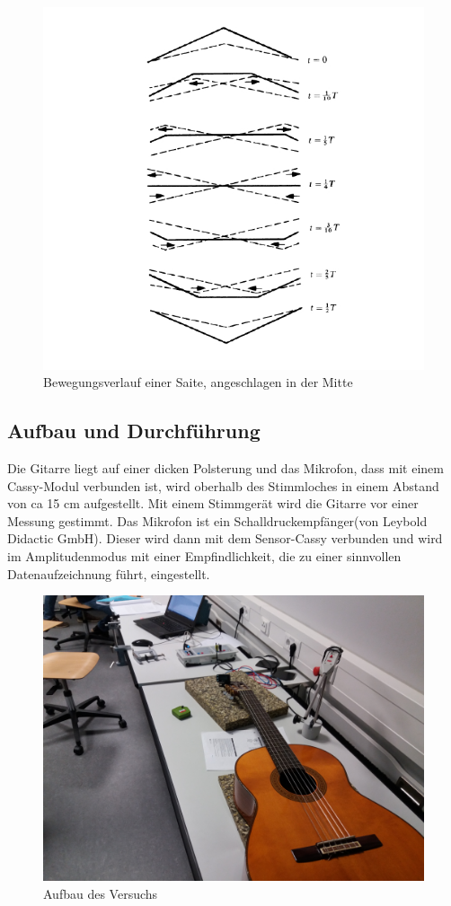 \documentclass[a4paper, 11pt]{article}
\begin{document}
\begin{figure}[H]
	\centering
	\includegraphics[scale=0.4]{../Bewegungsverlauf.jpg}
	\caption{Bewegungsverlauf einer Saite, angeschlagen in der Mitte}
	\label{fig:Bewegungsverlauf einer Saite, angeschlagen in der Mitte}
\end{figure}

\subsection{Aufbau und Durchführung}
Die Gitarre liegt auf einer dicken Polsterung und das Mikrofon, dass mit einem Cassy-Modul verbunden ist, wird oberhalb des Stimmloches in einem Abstand von ca 15 cm aufgestellt. 
Mit einem Stimmgerät wird die Gitarre vor einer Messung gestimmt. Das Mikrofon ist ein Schalldruckempfänger(von Leybold Didactic GmbH). Dieser wird dann mit dem Sensor-Cassy verbunden und wird im Amplitudenmodus mit einer Empfindlichkeit, die zu einer sinnvollen Datenaufzeichnung führt, eingestellt.
\begin{figure}[H]
	\centering
	\includegraphics[scale=0.05]{../Gitarre.jpg}
	\caption{Aufbau des Versuchs}
	\label{fig:Aufbau des Versuchs}
\end{figure}
\end{document}
